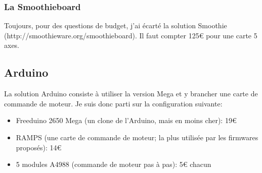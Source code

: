 \subsubsection{La Smoothieboard}
Toujours, pour des questions de budget, j'ai écarté la solution Smoothie %
(http://smoothieware.org/smoothieboard). Il faut compter 125\euro{} pour une %
carte 5 axes.
\subsection{Arduino}
La solution Arduino consiste à utiliser la version Mega et y brancher une carte %
de commande de moteur. Je suis donc parti sur la configuration suivante: %
\begin{itemize}%
\item{Freeduino 2650 Mega (un clone de l'Arduino, mais en moins cher): 19\euro}%
\item{RAMPS (une carte de commande de moteur; la plus utilisée par les firmwares %
proposés): 14\euro}%
\item{5 modules A4988 (commande de moteur pas à pas): 5\euro{} chacun}
\end{itemize}%